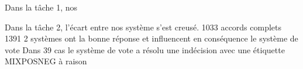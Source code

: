 \label{sec:resultats}

Dans la tâche 1, nos




Dans la tâche 2, l'écart entre nos système s'est creusé.
1033 accords complets
1391 2 systèmes ont la bonne réponse et influencent en conséquence le système de vote
Dans 39 cas le système de vote a résolu une indécision avec une étiquette MIXPOSNEG à raison


